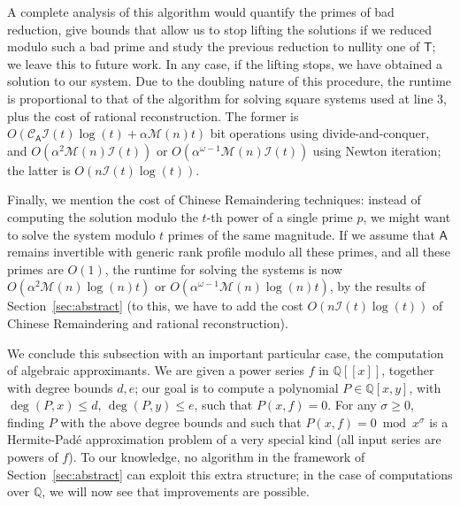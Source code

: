 \documentclass[sigconf]{acmart}
\newcommand{\vb}{\ensuremath{\mathsf{b}}}
\newcommand{\vr}{\ensuremath{\mathsf{r}}}
\newcommand{\vv}{\ensuremath{\mathsf{v}}}
\newcommand{\vx}{\ensuremath{\mathsf{x}}}
\newcommand{\vy}{\ensuremath{\mathsf{y}}}
\newcommand{\mA}{\ensuremath{\mathsf{A}}}
\newcommand{\mT}{\ensuremath{\mathsf{T}}}
\newcommand{\mW}{\ensuremath{\mathsf{W}}}
\newcommand{\Q}{\ensuremath{\mathbb{Q}}}
\newcommand{\M}{\ensuremath{\mathscr{M}}}
\newcommand{\I}{\ensuremath{\mathscr{I}}}
\newcommand{\CA}{\ensuremath{\mathscr{C}_\mA}}
\theoremstyle{acmdefinition}
\begin{document}

A complete analysis of this algorithm would quantify the primes of bad
reduction, give bounds that allow us to stop lifting the solutions if
we reduced modulo such a bad prime and study the previous reduction to
nullity one of $\mT$; we leave this to future work.  In any case, if
the lifting stops, we have obtained a solution to our system. Due to
the doubling nature of this procedure, the runtime is proportional to
that of the algorithm for solving square systems used at line 3, plus
the cost of rational reconstruction. The former is
$O(\CA \I(t) \log(t) +\alpha \M(n) t)$ bit operations using
divide-and-conquer, and $O(\alpha^2 \M(n) \I(t))$ or
$O(\alpha^{\omega-1} \M(n) \I(t))$ using Newton iteration; the latter
is $O(n \I(t) \log(t))$.

Finally, we mention the cost of Chinese Remaindering techniques:
instead of computing the solution modulo the $t$-th power of a single
prime $p$, we might want to solve the system modulo $t$ primes of the
same magnitude.  If we assume that $\mA$ remains invertible with
generic rank profile modulo all these primes, and all these primes are
$O(1)$, the runtime for solving the systems is now $O(\alpha^{2} \M(n)
\log(n) t)$ or $O(\alpha^{\omega-1} \M(n) \log(n) t)$, by the results
of Section~\ref{sec:abstract} (to this, we have to add the cost $O(n
\I(t) \log(t))$ of Chinese Remaindering and rational reconstruction).


We conclude this subsection with an important
particular case, the computation of algebraic approximants. We are
given a power series $f$ in $\Q[[x]]$, together with degree bounds
$d,e$; our goal is to compute a polynomial $P \in \Q[x,y]$, with
$\deg(P,x) \le d$, $\deg(P,y) \le e$, such that $P(x,f) = 0$.
For any $\sigma \ge 0$, finding $P$ with the above degree bounds and
such that $P(x,f) = 0 \bmod x^\sigma$ is a Hermite-Pad\'e
approximation problem of a very special kind (all input series are
powers of $f$). To our knowledge, no algorithm in the framework of
Section~\ref{sec:abstract} can exploit this extra structure;
in the case of computations over $\Q$, we will now see that
improvements are possible.
\end{document}
